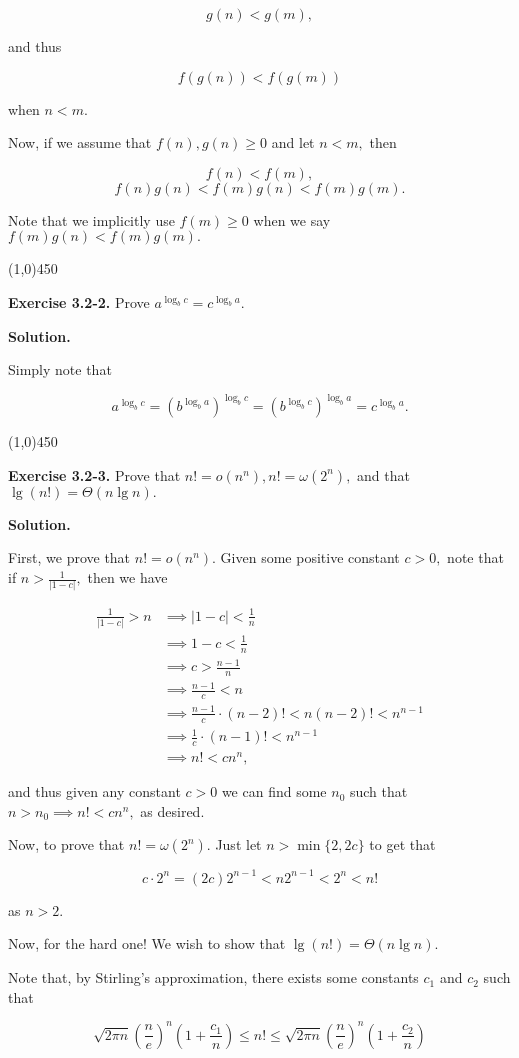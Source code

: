 \documentclass{article}
\newcommand{\exec}[2]
{\textbf{Exercise #1.} #2

\textbf{Solution.}}
\newcommand{\bardiv}{\begin{center}
\line(1,0){450}
\end{center}}
\begin{document}
$$g(n) < g(m),$$

and thus

$$f(g(n)) < f(g(m))$$

when $n < m.$ 

Now, if we assume that $f(n), g(n) \geq 0$ and let $n < m,$ then

$$f(n) < f(m),$$
$$f(n)g(n) < f(m)g(n) < f(m)g(m).$$

Note that we implicitly use $f(m) \geq 0$ when we say $f(m)g(n) < f(m)g(m).$

\bardiv

\exec{3.2-2}{Prove $a^{\log_b c} = c^{\log_b a}.$}

Simply note that

$$a^{\log_b c} = (b^{\log_b a})^{\log_b c} = (b^{\log_b c})^{\log_b a} = c^{\log_b a}.$$

\bardiv

\exec{3.2-3}{Prove that $n! = o(n^n), n! = \omega(2^n),$ and that $\lg(n!) = \Theta(n \lg n).$}

First, we prove that $n! = o(n^n).$ Given some positive constant $c > 0,$ note that if $n > \frac{1}{|1-c|},$ then we have

\begin{align*}
\frac{1}{|1-c|} > n &\implies |1-c| < \frac{1}{n} \\
		    &\implies 1-c < \frac{1}{n} \\
		    &\implies c > \frac{n-1}{n} \\
		    &\implies \frac{n-1}{c} < n \\
		    &\implies \frac{n-1}{c} \cdot (n-2)! < n(n-2)! < n^{n-1} \\
		    &\implies \frac{1}{c} \cdot (n-1)! < n^{n-1} \\
		    &\implies n! < cn^n,
\end{align*}

and thus given any constant $c > 0$ we can find some $n_0$ such that $n > n_0 \implies n! < cn^n,$ as desired.

Now, to prove that $n! = \omega(2^n).$ Just let $n > \min\{2, 2c\}$ to get that

$$c\cdot 2^n = (2c)2^{n-1} < n2^{n-1} < 2^n < n!$$

as $n > 2.$

Now, for the hard one! We wish to show that $\lg(n!) = \Theta(n\lg n).$

Note that, by Stirling's approximation, there exists some constants $c_1$ and $c_2$ such that

$$\sqrt{2\pi n}\left(\frac{n}{e}\right)^n \left(1+\frac{c_1}{n}\right) \leq n! \leq \sqrt{2\pi n}\left(\frac{n}{e}\right)^n \left(1+\frac{c_2}{n}\right)$$
\end{document}
